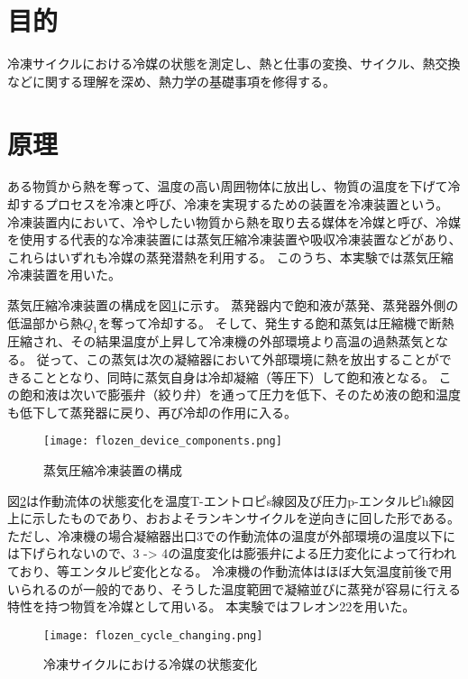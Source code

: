 \documentclass{jarticle}
\begin{document}
\section{目的}
	冷凍サイクルにおける冷媒の状態を測定し、熱と仕事の変換、サイクル、熱交換などに関する理解を深め、熱力学の基礎事項を修得する。

\section{原理}
	

ある物質から熱を奪って、温度の高い周囲物体に放出し、物質の温度を下げて冷却するプロセスを冷凍と呼び、冷凍を実現するための装置を冷凍装置という。
	冷凍装置内において、冷やしたい物質から熱を取り去る媒体を冷媒と呼び、冷媒を使用する代表的な冷凍装置には蒸気圧縮冷凍装置や吸収冷凍装置などがあり、これらはいずれも冷媒の蒸発潜熱を利用する。
	このうち、本実験では蒸気圧縮冷凍装置を用いた。
	\par 蒸気圧縮冷凍装置の構成を図\ref{fig:flozen_device_components}に示す。
	蒸発器内で飽和液が蒸発、蒸発器外側の低温部から熱$Q_1$を奪って冷却する。
	そして、発生する飽和蒸気は圧縮機で断熱圧縮され、その結果温度が上昇して冷凍機の外部環境より高温の過熱蒸気となる。
	従って、この蒸気は次の凝縮器において外部環境に熱を放出することができることとなり、同時に蒸気自身は冷却凝縮（等圧下）して飽和液となる。
	この飽和液は次いで膨張弁（絞り弁）を通って圧力を低下、そのため液の飽和温度も低下して蒸発器に戻り、再び冷却の作用に入る。

	\begin{figure}[H]
		\centering
		\hspace{-2cm}
		\vspace{0cm}
		\texttt{[image: flozen\_device\_components.png]}
		\caption{蒸気圧縮冷凍装置の構成}
		\label{fig:flozen_device_components}
	\end{figure}

	\par 図\ref{fig:flozen_cycle_changing}は作動流体の状態変化を温度T-エントロピs線図及び圧力p-エンタルピh線図上に示したものであり、おおよそランキンサイクルを逆向きに回した形である。
	ただし、冷凍機の場合凝縮器出口3での作動流体の温度が外部環境の温度以下には下げられないので、3 -> 4の温度変化は膨張弁による圧力変化によって行われており、等エンタルピ変化となる。
	冷凍機の作動流体はほぼ大気温度前後で用いられるのが一般的であり、そうした温度範囲で凝縮並びに蒸発が容易に行える特性を持つ物質を冷媒として用いる。
	本実験ではフレオン22を用いた。

	\begin{figure}[H]
		\centering
		\hspace{-2cm}
		\vspace{0cm}
		\texttt{[image: flozen\_cycle\_changing.png]}
		\caption{冷凍サイクルにおける冷媒の状態変化}
		\label{fig:flozen_cycle_changing}
	\end{figure}
\end{document}
